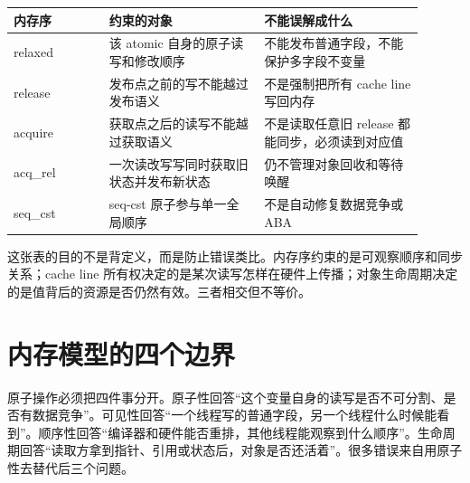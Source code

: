 \begin{center}
\small
\begin{tabular}{@{}p{0.21\linewidth}p{0.34\linewidth}p{0.35\linewidth}@{}}
\toprule
内存序 & 约束的对象 & 不能误解成什么 \\
\midrule
relaxed & 该 atomic 自身的原子读写和修改顺序 & 不能发布普通字段，不能保护多字段不变量 \\
release & 发布点之前的写不能越过发布语义 & 不是强制把所有 cache line 写回内存 \\
acquire & 获取点之后的读写不能越过获取语义 & 不是读取任意旧 release 都能同步，必须读到对应值 \\
acq\_rel & 一次读改写写同时获取旧状态并发布新状态 & 仍不管理对象回收和等待唤醒 \\
seq\_cst & seq-cst 原子参与单一全局顺序 & 不是自动修复数据竞争或 ABA \\
\bottomrule
\end{tabular}
\end{center}

这张表的目的不是背定义，而是防止错误类比。内存序约束的是可观察顺序和同步关系；cache line 所有权决定的是某次读写怎样在硬件上传播；对象生命周期决定的是值背后的资源是否仍然有效。三者相交但不等价。

\section{内存模型的四个边界}

原子操作必须把四件事分开。原子性回答“这个变量自身的读写是否不可分割、是否有数据竞争”。可见性回答“一个线程写的普通字段，另一个线程什么时候能看到”。顺序性回答“编译器和硬件能否重排，其他线程能观察到什么顺序”。生命周期回答“读取方拿到指针、引用或状态后，对象是否还活着”。很多错误来自用原子性去替代后三个问题。

